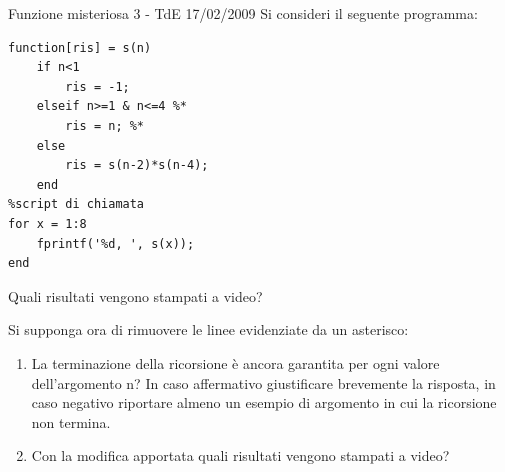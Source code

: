 \documentclass[format=169, handout]{beamer}
\begin{document}
\begin{frame}{Funzione misteriosa 3 - TdE 17/02/2009}
	Si consideri il seguente programma:
\begin{lstlisting}[style=matlab, basicstyle=\small]
function[ris] = s(n)
    if n<1
        ris = -1;
    elseif n>=1 & n<=4 %*
        ris = n; %*
    else
        ris = s(n-2)*s(n-4);
    end
%script di chiamata
for x = 1:8
    fprintf('%d, ', s(x));    
end    
\end{lstlisting}
	
	Quali risultati vengono stampati a video?
	
	Si supponga ora di rimuovere le linee evidenziate da un asterisco:
	\begin{enumerate}
		\item La terminazione della ricorsione è ancora garantita per ogni valore
		dell’argomento n? In caso affermativo giustificare brevemente la risposta,
		in caso negativo riportare almeno un esempio di argomento in cui la
		ricorsione non termina.
		
		\item Con la modifica apportata quali risultati vengono stampati a video?
	\end{enumerate}
\end{frame}
\end{document}
